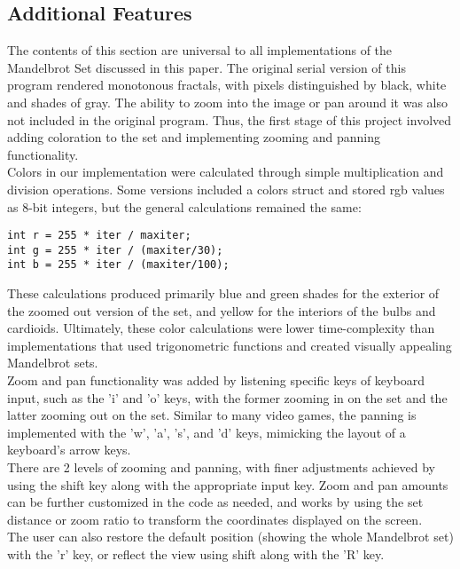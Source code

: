 \documentclass{article}
\begin{document}
\subsection{Additional Features}

The contents of this section are universal to all implementations of the Mandelbrot Set discussed in this paper.
The original serial version of this program rendered monotonous fractals, with pixels distinguished by black, white and shades of gray.
The ability to zoom into the image or pan around it was also not included in the original program.
Thus, the first stage of this project involved adding coloration to the set and implementing zooming and panning functionality.\\

Colors in our implementation were calculated through simple multiplication and division operations.
Some versions included a colors struct and stored rgb values as 8-bit integers, but the general calculations remained the same:

\begin{verbatim}
int r = 255 * iter / maxiter;
int g = 255 * iter / (maxiter/30);
int b = 255 * iter / (maxiter/100);
\end{verbatim}

These calculations produced primarily blue and green shades for the exterior of the zoomed out version of the set, and yellow for the interiors of the bulbs and cardioids.
Ultimately, these color calculations were lower time-complexity than implementations that used trigonometric functions and created visually appealing Mandelbrot sets.\\

Zoom and pan functionality was added by listening specific keys of keyboard input, such as the 'i' and 'o' keys, with the former zooming in on the set and the latter zooming out on the set.
Similar to many video games, the panning is implemented with the 'w', 'a', 's', and 'd' keys, mimicking the layout of a keyboard's arrow keys.\\

There are 2 levels of zooming and panning, with finer adjustments achieved by using the shift key along with the appropriate input key.
Zoom and pan amounts can be further customized in the code as needed, and works by using the set distance or zoom ratio to transform the coordinates displayed on the screen.\\

The user can also restore the default position (showing the whole Mandelbrot set) with the 'r' key, or reflect the view using shift along with the 'R' key.
\end{document}
